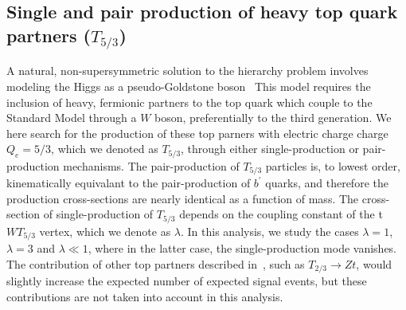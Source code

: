 
\subsection{Single and pair production of heavy top quark partners ($T_{5/3}$)}

A natural, non-supersymmetric solution to the hierarchy problem involves modeling the Higgs as a pseudo-Goldstone boson~\cite{Contino:2008cx}
This model requires the inclusion of heavy, fermionic partners to the top quark which couple to the Standard Model through a $W$ boson, preferentially to the third generation.
We here search for the production of these top parners with electric charge charge $Q_{e}=5/3$, which we denoted as $T_{5/3}$, through either single-production or pair-production mechanisms.
The pair-production of $T_{5/3}$ particles is, to lowest order, kinematically equivalant to the pair-production of $b^{\prime}$ quarks, and therefore the production cross-sections are nearly identical as a function of mass.
The cross-section of single-production of $T_{5/3}$ depends on the coupling constant of the t$WT_{5/3}$ vertex, which we denote as $\lambda$.
In this analysis, we study the cases $\lambda=1$, $\lambda=3$ and $\lambda\ll 1$, where in the latter case, the single-production mode vanishes.
The contribution of other top partners described in~\cite{Contino:2008cx}, such as $T_{2/3} \rightarrow Zt$, would slightly increase the expected number of expected signal events, but these contributions are not taken into account in this analysis. 

